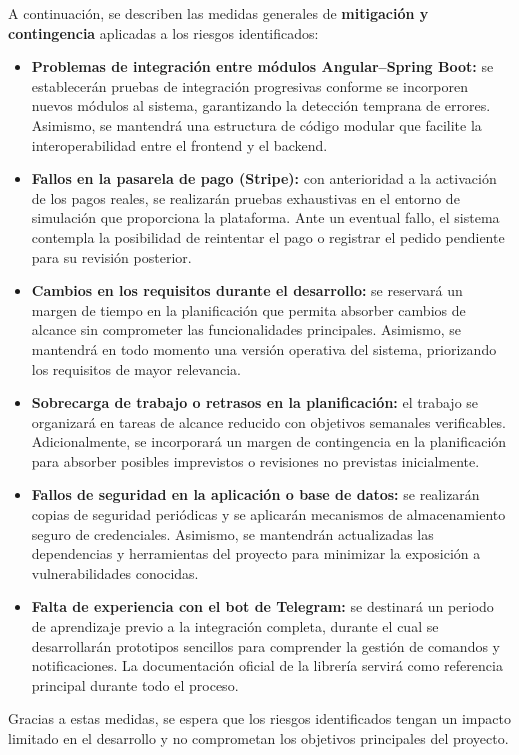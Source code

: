 A continuación, se describen las medidas generales de \textbf{mitigación y contingencia} aplicadas a los riesgos identificados:

\begin{itemize}
    \item \textbf{Problemas de integración entre módulos Angular–Spring Boot:} se establecerán pruebas de integración progresivas conforme se incorporen nuevos módulos al sistema, garantizando la detección temprana de errores. Asimismo, se mantendrá una estructura de código modular que facilite la interoperabilidad entre el frontend y el backend.

    \item \textbf{Fallos en la pasarela de pago (Stripe):} con anterioridad a la activación de los pagos reales, se realizarán pruebas exhaustivas en el entorno de simulación que proporciona la plataforma. Ante un eventual fallo, el sistema contempla la posibilidad de reintentar el pago o registrar el pedido pendiente para su revisión posterior.

    \item \textbf{Cambios en los requisitos durante el desarrollo:} se reservará un margen de tiempo en la planificación que permita absorber cambios de alcance sin comprometer las funcionalidades principales. Asimismo, se mantendrá en todo momento una versión operativa del sistema, priorizando los requisitos de mayor relevancia.

    \item \textbf{Sobrecarga de trabajo o retrasos en la planificación:} el trabajo se organizará en tareas de alcance reducido con objetivos semanales verificables. Adicionalmente, se incorporará un margen de contingencia en la planificación para absorber posibles imprevistos o revisiones no previstas inicialmente.

    \item \textbf{Fallos de seguridad en la aplicación o base de datos:} se realizarán copias de seguridad periódicas y se aplicarán mecanismos de almacenamiento seguro de credenciales. Asimismo, se mantendrán actualizadas las dependencias y herramientas del proyecto para minimizar la exposición a vulnerabilidades conocidas.

    \item \textbf{Falta de experiencia con el bot de Telegram:} se destinará un periodo de aprendizaje previo a la integración completa, durante el cual se desarrollarán prototipos sencillos para comprender la gestión de comandos y notificaciones. La documentación oficial de la librería servirá como referencia principal durante todo el proceso.
\end{itemize}
Gracias a estas medidas, se espera que los riesgos identificados tengan un impacto limitado en el desarrollo y no comprometan los objetivos principales del proyecto.



